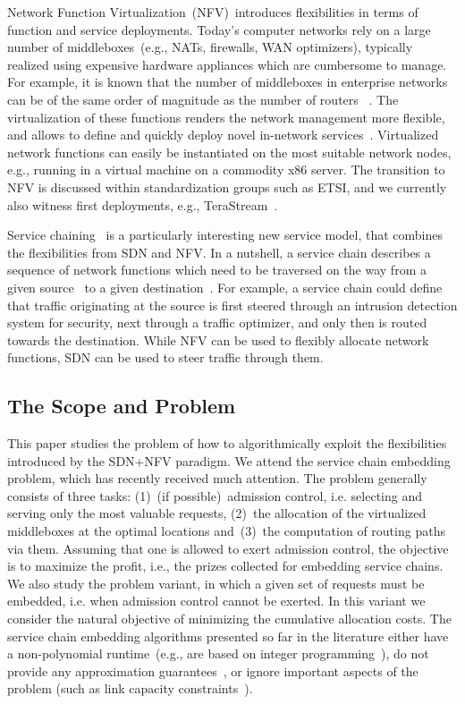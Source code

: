 \documentclass[10pt, conference, letterpaper]{IEEEtran}
\begin{document}
Network Function Virtualization~(NFV)~introduces flexibilities in terms
of function and service deployments. Today's computer networks 
rely on a large number of middleboxes~(e.g., NATs, firewalls, WAN optimizers),
typically realized using expensive hardware appliances which are cumbersome to manage.
For example, it is known that the number of middleboxes in enterprise 
networks can be of the same order of magnitude as the number
of routers ~\cite{someone}.
The virtualization of these functions renders the network management
more flexible, and allows to define and quickly deploy novel in-network services~\cite{routebricks,opennf,sosr15,modeling-middleboxes,clickos}.
Virtualized network functions can easily be instantiated 
on the most suitable
network nodes, e.g., running in a virtual machine
on a commodity x86 server.
The transition to NFV is discussed
within standardization groups such as ETSI, and we currently also
witness first
deployments, e.g., TeraStream~\cite{terastream}.

Service chaining~\cite{ewsdn14,stefano-sigc,merlin} is a particularly interesting new service model,
that combines the flexibilities from SDN and NFV.
In a nutshell, a service chain describes a sequence of
network functions which need to be traversed on the way
from a given source~ to a given destination~. 
For example, a service chain could define that
 traffic originating at the source is first steered through
an intrusion detection system
for security,
next through a traffic optimizer,
and only then is routed towards the destination.
While NFV can be used to flexibly allocate network functions,
SDN can be used to steer traffic through them.

\subsection{The Scope and Problem} 

This paper studies the problem of how to algorithmically exploit the flexibilities 
introduced by the SDN+NFV paradigm. 
We attend the service chain embedding problem, which has recently
received much attention. The problem generally consists of three tasks:
(1)~(if possible)~admission control, i.e. selecting and serving
only the most valuable requests,
(2)~the allocation of the virtualized
middleboxes at the optimal locations 
and~(3)~the computation of routing paths via them. 
Assuming that one is allowed to exert admission control, the objective is to maximize the profit, i.e., the prizes collected for embedding service chains. We also study the problem variant, in which a given set of requests must be embedded, i.e. when admission control cannot be exerted. In this variant we consider the natural objective of minimizing the cumulative allocation costs.
The service chain embedding algorithms presented
so far in the literature either have a
non-polynomial runtime~(e.g., are based on integer programming~\cite{mehraghdam2014specifying,stefano-sigc,merlin}),
do not provide any approximation guarantees~\cite{karl-chains},
or ignore important aspects of the problem (such as 
link capacity constraints~\cite{sirocco15}). 
\end{document}
